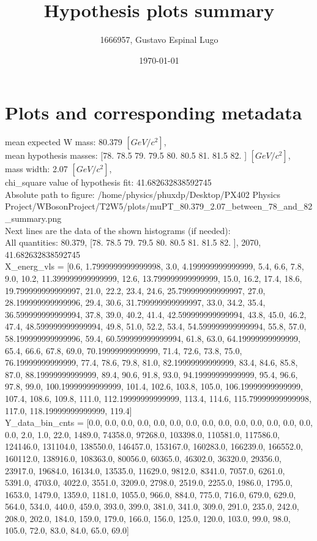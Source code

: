 \documentclass[12pt]{article}
\begin{document}
	\title{Hypothesis plots summary} %
	\author{1666957, Gustavo Espinal Lugo}
	\date{\today} %

	\maketitle
	
	\section*{Plots and corresponding metadata}
	mean expected W mass: 80.379 $[GeV/c^{2}]$,\\
mean hypothesis masses: [78.  78.5 79.  79.5 80.  80.5 81.  81.5 82. ] $[GeV/c^{2}]$,\\
mass width: 2.07 $[GeV/c^{2}]$,\\
chi\_square value of hypothesis fit: 41.682632838592745\\
	Absolute path to figure: /home/physics/phuxdp/Desktop/PX402 Physics Project/WBosonProject/T2W5/plots/muPT\_80.379\_2.07\_between\_78\_and\_82\_summary.png\\
	Next lines are the data of the shown histograms (if needed): \\
	All quantities: 	80.379, [78.  78.5 79.  79.5 80.  80.5 81.  81.5 82. ], 2070, 41.682632838592745\\
	X\_energ\_vls = [0.6, 1.7999999999999998, 3.0, 4.199999999999999, 5.4, 6.6, 7.8, 9.0, 10.2, 11.399999999999999, 12.6, 13.799999999999999, 15.0, 16.2, 17.4, 18.6, 19.799999999999997, 21.0, 22.2, 23.4, 24.6, 25.799999999999997, 27.0, 28.199999999999996, 29.4, 30.6, 31.799999999999997, 33.0, 34.2, 35.4, 36.599999999999994, 37.8, 39.0, 40.2, 41.4, 42.599999999999994, 43.8, 45.0, 46.2, 47.4, 48.599999999999994, 49.8, 51.0, 52.2, 53.4, 54.599999999999994, 55.8, 57.0, 58.199999999999996, 59.4, 60.599999999999994, 61.8, 63.0, 64.19999999999999, 65.4, 66.6, 67.8, 69.0, 70.19999999999999, 71.4, 72.6, 73.8, 75.0, 76.19999999999999, 77.4, 78.6, 79.8, 81.0, 82.19999999999999, 83.4, 84.6, 85.8, 87.0, 88.19999999999999, 89.4, 90.6, 91.8, 93.0, 94.19999999999999, 95.4, 96.6, 97.8, 99.0, 100.19999999999999, 101.4, 102.6, 103.8, 105.0, 106.19999999999999, 107.4, 108.6, 109.8, 111.0, 112.19999999999999, 113.4, 114.6, 115.79999999999998, 117.0, 118.19999999999999, 119.4]\\
	Y\_data\_bin\_cnts = [0.0, 0.0, 0.0, 0.0, 0.0, 0.0, 0.0, 0.0, 0.0, 0.0, 0.0, 0.0, 0.0, 0.0, 0.0, 2.0, 1.0, 22.0, 1489.0, 74358.0, 97268.0, 103398.0, 110581.0, 117586.0, 124146.0, 131104.0, 138550.0, 146457.0, 153167.0, 160283.0, 166239.0, 166552.0, 160112.0, 138916.0, 108363.0, 80056.0, 60365.0, 46302.0, 36320.0, 29356.0, 23917.0, 19684.0, 16134.0, 13535.0, 11629.0, 9812.0, 8341.0, 7057.0, 6261.0, 5391.0, 4703.0, 4022.0, 3551.0, 3209.0, 2798.0, 2519.0, 2255.0, 1986.0, 1795.0, 1653.0, 1479.0, 1359.0, 1181.0, 1055.0, 966.0, 884.0, 775.0, 716.0, 679.0, 629.0, 564.0, 534.0, 440.0, 459.0, 393.0, 399.0, 381.0, 341.0, 309.0, 291.0, 235.0, 242.0, 208.0, 202.0, 184.0, 159.0, 179.0, 166.0, 156.0, 125.0, 120.0, 103.0, 99.0, 98.0, 105.0, 72.0, 83.0, 84.0, 65.0, 69.0]\\
\end{document}
